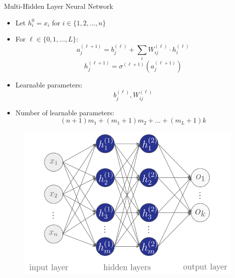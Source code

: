 \documentclass[serif, aspectratio=169]{beamer}
\begin{document}
\begin{frame}{Multi-Hidden Layer Neural Network}
    \begin{itemize}
        \item Let $h^0_i = x_i$ for $i \in \{1, 2, \ldots, n  \}$
        \item For $\ell \in \{0, 1, \ldots, L \}$:
        $$a^{(\ell+1)}_j = b^{(\ell)}_j + \sum_i W^{(\ell)}_{ij}\cdot h^{(\ell)}_i$$
        $$h^{(\ell+1)}_j = \sigma^{(\ell+1)}(a^{(\ell+1)}_j)$$

        \item Learnable parameters:
        $$b^{(\ell)}_j, W^{(\ell)}_{ij}$$

        \item Number of learnable parameters:
        $$(n+1)m_1 + (m_1 + 1)m_2 + ... + (m_L + 1)k$$
    \end{itemize}
    \endminipage
    \hfill
        \begin{figure}[bh]
            \includegraphics[width=\linewidth]{pic/2/multi-hidden-nn.png}
        \end{figure}
    \endminipage
\end{frame}
\end{document}
